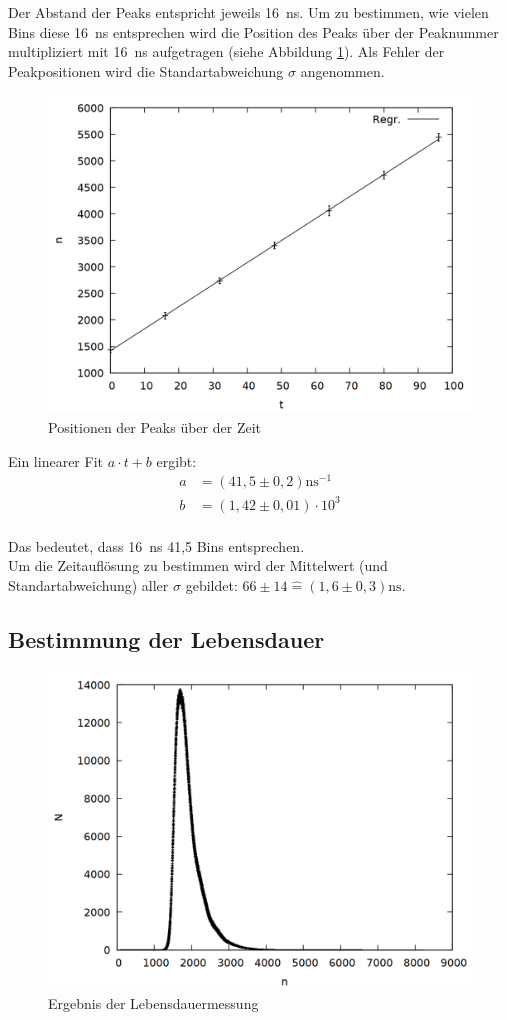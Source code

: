 Der Abstand der Peaks entspricht jeweils \SI{16}{\nano\second}. Um zu bestimmen, wie vielen Bins diese \SI{16}{\nano\second} entsprechen wird die Position des Peaks über der Peaknummer multipliziert mit \SI{16}{\nano\second} aufgetragen (siehe Abbildung \ref{fig:prompt_time}). Als Fehler der Peakpositionen wird die Standartabweichung $\sigma$ angenommen.  

\begin{figure}
\centering
\includegraphics[width=0.7\linewidth]{data/prompt_time.png}
\caption{Positionen der Peaks über der Zeit}
\label{fig:prompt_time}
\end{figure}

Ein linearer Fit $a\cdot t + b$ ergibt:\\
\begin{align*}
a &= (41,5 \pm 0,2) \si{\nano\second}^{-1}\\
b &= (1,42 \pm 0,01) \cdot 10^{3}\\
\end{align*}

Das bedeutet, dass \SI{16}{\nano\second} 41,5 Bins entsprechen.\\

Um die Zeitauflösung zu bestimmen wird der Mittelwert (und Standartabweichung) aller $\sigma$ gebildet: $66 \pm 14 \mathrel{\widehat{=}} \si{(1,6 \pm 0,3) \nano\second}$. 

\subsection{Bestimmung der Lebensdauer}

\begin{figure}
\centering
\includegraphics[width=0.7\linewidth]{data/uebernacht.png}
\caption{Ergebnis der Lebensdauermessung}
\label{fig:halflife}
\end{figure}

